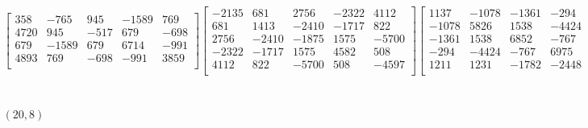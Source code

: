 \documentclass[12pt]{amsart}
\theoremstyle{plain}
\theoremstyle{definition}
\begin{document}
\begin{landscape}
\begin{align*}
\begin{bmatrix}
 358  &   -765  &   945  &   -1589  &   769  \\ 
 4720  &   945  &   -517  &   679  &   -698  \\ 
 679  &   -1589  &   679  &   6714  &   -991  \\ 
 4893  &   769  &   -698  &   -991  &   3859  \\ 
\end{bmatrix}
\begin{bmatrix}
-2135  &   681  &   2756  &   -2322  &   4112  \\ 
 681  &   1413  &   -2410  &   -1717  &   822  \\ 
 2756  &   -2410  &   -1875  &   1575  &   -5700  \\ 
 -2322  &   -1717  &   1575  &   4582  &   508  \\ 
 4112  &   822  &   -5700  &   508  &   -4597  \\ 
\end{bmatrix}
\begin{bmatrix}
1137  &   -1078  &   -1361  &   -294  &   1211  \\ 
 -1078  &   5826  &   1538  &   -4424  &   1231  \\ 
 -1361  &   1538  &   6852  &   -767  &   -1782  \\ 
 -294  &   -4424  &   -767  &   6975  &   -2448  \\ 
 1211  &   1231  &   -1782  &   -2448  &   2336  \\ 
\end{bmatrix}
\begin{bmatrix}
-531  &   -456  &   417  &   1461  &   -999  \\ 
 -456  &   -1966  &   1488  &   2162  &   -1431  \\ 
 417  &   1488  &   -2747  &   -287  &   1945  \\ 
 1461  &   2162  &   -287  &   -5963  &   2375  \\ 
 -999  &   -1431  &   1945  &   2375  &   -2437  \\ 
\end{bmatrix}
\\
(20,8) &:
\begin{bmatrix}
513  &   -3040  &   1827  &   1056  &   3131  \\ 
 -3040  &   -1968  &   718  &   -1480  &   2564  \\ 
 1827  &   718  &   69  &   2687  &   1553  \\ 
 1056  &   -1480  &   2687  &   4643  &   2837  \\ 
 3131  &   2564  &   1553  &   2837  &   -883  \\ 

\end{bmatrix}
\end{align*}
\end{landscape}
\end{document}
